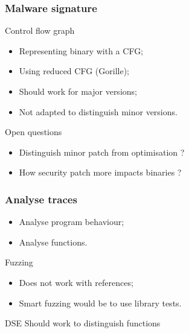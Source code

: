 \documentclass[11pt]{beamer}
\begin{document}
\begin{frame}
    \frametitle{Malware signature}
    
    \begin{block}{Control flow graph}
    	\begin{itemize}
    		\item Representing binary with a CFG;
    		\item Using reduced CFG (Gorille);
    		\item Should work for major versions;  	
    		\item Not adapted to distinguish minor versions.
    	\end{itemize}
    \end{block}
    
    \begin{block}{Open questions}
    	\begin{itemize}
    		\item Distinguish minor patch from optimisation ?
    		\item How security patch more impacts binaries ?
    	\end{itemize}
    \end{block}
    
\end{frame}

\begin{frame}
    \frametitle{Analyse traces}
    \begin{block}{}
    	\begin{itemize}
    		\item Analyse program behaviour;
    		\item Analyse functions.

    	\end{itemize}
    \end{block}
    
    \begin{block}{Fuzzing}
    	\begin{itemize}
    		\item Does not work with references;
    		\item Smart fuzzing would be to use library tests.
    	\end{itemize}
    \end{block}
    
    \begin{block}{DSE}
    		Should work to distinguish functions

    \end{block}
    
\end{frame}
\end{document}
